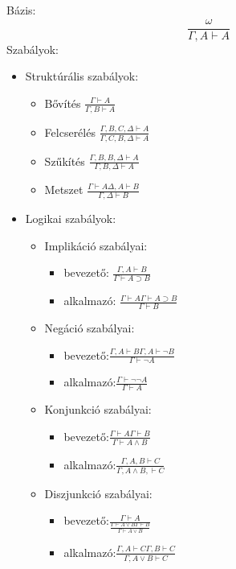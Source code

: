 \begin{definition}
Bázis:
\begin{equation}
	\frac{\omega}{\Gamma,A \vdash A}
\end{equation}
Szabályok:
\begin{itemize}
	\item Struktúrális szabályok:
	\begin{itemize}
		\item Bővítés $\frac{\Gamma \vdash A}{\Gamma, B \vdash A} $
		\item Felcserélés $\frac{\Gamma,B,C,\Delta\vdash A} {\Gamma,C,B,\Delta\vdash A} $
		\item Szűkítés $\frac{\Gamma,B,B,\Delta\vdash A}
		{\Gamma,B,\Delta\vdash A} $
		\item Metszet $\frac{\Gamma\vdash A \Delta,A\vdash B}{\Gamma,\Delta\vdash B} $
	\end{itemize}
	\item Logikai szabályok:
	\begin{itemize}
		\item Implikáció szabályai:
		\begin{itemize}
			\item bevezető: $\frac{\Gamma,A\vdash B}{\Gamma\vdash A \supset B} $
			\item alkalmazó: $\frac{\Gamma\vdash A \Gamma\vdash A \supset B}{\Gamma \vdash B} $
		\end{itemize}
		\item Negáció szabályai:
		\begin{itemize}
			\item bevezető:$\frac{\Gamma,A\vdash B \Gamma,A\vdash \neg B}{\Gamma\vdash \neg A} $
			\item alkalmazó:$\frac{\Gamma\vdash \neg\neg A}{\Gamma \vdash A}$
		\end{itemize}
		\item Konjunkció szabályai:
		\begin{itemize}
			\item bevezető:$\frac{\Gamma\vdash A \Gamma\vdash B}{\Gamma\vdash A\land B}$
			\item alkalmazó:$\frac{\Gamma,A,B\vdash C}{\Gamma,A\land B,\vdash C}$
		\end{itemize}
		\item Diszjunkció szabályai:
		\begin{itemize}
			\item bevezető:$\frac{\Gamma\vdash A}{\frac{\Gamma\vdash A \lor B \Gamma\vdash B}{\Gamma\vdash A \lor B}}$
			\item alkalmazó:$\frac{\Gamma,A\vdash C \Gamma,B\vdash C}{\Gamma,A\lor B\vdash C}$

\end{itemize}
\end{itemize}
\end{itemize}
\end{definition}
